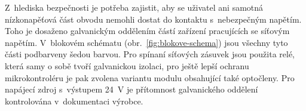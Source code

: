     Z~hlediska bezpečnosti je potřeba zajistit, aby se uživatel ani samotná nízkonapěťová část obvodu nemohli dostat do kontaktu s~nebezpečným napětím. Toho je dosaženo galvanickým oddělením částí zařízení pracujících se síťovým napětím. V~blokovém schématu (obr.~\ref{fig:blokove-schema}) jsou všechny tyto části podbarveny šedou barvou. Pro spínaní síťových zásuvek jsou použita relé, která samy o sobě tvoří galvanickou izolaci, pro ještě lepší ochranu mikrokontroléru je pak zvolena variantu modulu obsahující také optočleny. Pro napájecí zdroj s~výstupem \qty{24}{V} je přítomnost galvanického oddělení kontrolována v~dokumentaci výrobce. 
    


    
    

